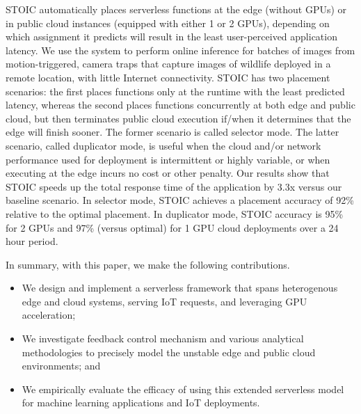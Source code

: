 STOIC automatically places serverless functions at the edge (without GPUs) or in public
cloud instances (equipped with either 1 or 2 GPUs), depending on which
assignment it
predicts will result in the least user-perceived application latency. 
We use the system to perform online
inference for batches of images from motion-triggered, camera traps that
capture images of wildlife deployed in a remote location, with little Internet
connectivity.
STOIC has two placement scenarios: the first
places functions only at the runtime with the least predicted latency, whereas the
second places functions concurrently at both edge and public cloud, but then
terminates public cloud execution if/when it determines that the edge will
finish sooner.  The former scenario
is called selector mode. The latter scenario, called duplicator mode, is
useful when the cloud and/or network performance used for deployment is
intermittent or highly variable, or when executing at the edge incurs no
cost or other penalty. Our results show that STOIC speeds up the total response time of the
application by 3.3x versus our baseline scenario. In selector mode, STOIC
achieves a placement accuracy of 92\% relative to the optimal placement.  In duplicator mode, STOIC accuracy is
95\% for 2 GPUs and 97\% (versus optimal) for 1 GPU cloud deployments over a 24 hour period.

In summary, with this paper, we make the following contributions.
\begin{itemize}
\item We design and
implement a serverless framework that spans heterogenous edge and cloud systems,
serving IoT requests, and leveraging GPU acceleration;
\item We investigate feedback control mechanism and various
analytical methodologies to precisely model the unstable edge and public cloud
environments; and 
\item We empirically evaluate the efficacy of using this extended serverless model
for machine learning applications and IoT deployments.
\end{itemize}

